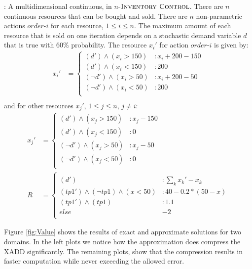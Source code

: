 \Invent:
A multidimensional continuous, in $n$-$\textsc{Inventory Control}$. There are $n$ continuous resources that can be bought and sold. There are $n$ non-parametric actions $order$-$i$ for each resource, $ 1 \leq i \leq n$. The maximum amount of  each resource that is sold on one iteration depends on a stochastic demand variable $d$ that is true with $60\%$ probability. The resource $x_i'$ for action $order$-$i$ is given by:
{\scriptsize
\begin{align*}
x_i' & = \begin{cases} 
(d') \wedge (x_i > 150) &: x_i + 200 - 150\\
(d') \wedge (x_i < 150) &:  200\\
(\neg d') \wedge (x_i > 50) &: x_i + 200 - 50\\
(\neg d') \wedge (x_i < 50) &:  200\\
\end{cases} \\
\end{align*} }
and for other resources $x_j'$, $1 \leq j \leq n$, $j\neq i$:\\
{\scriptsize
\begin{align*}
x_j' & = \begin{cases} 
(d') \wedge (x_j > 150) &: x_j - 150\\
(d') \wedge (x_j < 150) &:  0\\
(\neg d') \wedge (x_j > 50) &: x_j - 50\\
(\neg d') \wedge (x_j < 50) &:  0\\
\end{cases} \\
R & = \begin{cases} \\
(d') &: \sum_{k} {x_k' - x_k}\\
(tp1') \wedge (\neg tp1) \wedge (x < 50) &: 40 - 0.2*(50-x)\\
(tp1') \wedge ( tp1) &:  1.1\\
else & -2\\
\end{cases} 
\end{align*} }


Figure \ref{fig:Value} shows the results of exact and approximate solutions for two domains. In the left plots we notice how the approximation does compress the XADD significantly. The remaining plots, show that the compression results in faster computation while never exceeding the allowed error.
